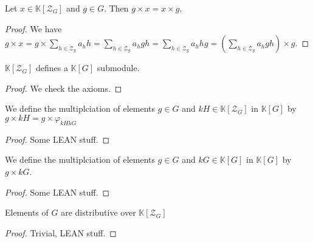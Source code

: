 \begin{proposition}
    \label{prop:center_commutes_single}
    \leanok
    Let $x\in\mathbb{K}[\mathcal{Z}_G]$ and $g\in G$. Then $g\times x = x \times g$.
\end{proposition}
\begin{proof}
    \leanok
    We have $g\times x = g\times \sum\limits_{h\in\mathcal{Z}_g}a_hh=\sum\limits_{h\in\mathcal{Z}_g}a_hgh
    =\sum\limits_{h\in\mathcal{Z}_g}a_hhg=\left(\sum\limits_{h\in\mathcal{Z}_g}a_hgh\right)\times g$.
\end{proof}

\begin{definition}
    \label{def:center_sub_module}
    \leanok
    $\mathbb{K}[\mathcal{Z}_G]$ defines a $\mathbb{K}[G]$ submodule.
    \begin{proof}    
        \leanok
        We check the axioms.
    \end{proof}
\end{definition}

\begin{definition}
    \label{def:hmul_g_kH_kG}
    \leanok
    We define the multiplciation of elements $g\in G$ and $kH\in\mathbb{K}[\mathcal{Z}_G]$ in $\mathbb{K}[G]$
    by $g\times kH=g\times \varphi_{kHkG}$
    \begin{proof}    
        \leanok
        Some LEAN stuff.
    \end{proof}
\end{definition}

\begin{definition}
    \label{def:hmul_g_kG}
    \leanok
    We define the multiplciation of elements $g\in G$ and $kG\in\mathbb{K}[G]$ in $\mathbb{K}[G]$
    by $g\times kG$.
    \begin{proof}    
        \leanok
        Some LEAN stuff.
    \end{proof}
\end{definition}

\begin{proposition}
    \label{prop:hmul_g_kH_kG_distrib}
    \leanok
    Elements of $G$ are distributive over $\mathbb{K}[\mathcal{Z}_G]$
\end{proposition}
\begin{proof}
    \leanok
    Trivial, LEAN stuff.
\end{proof}

